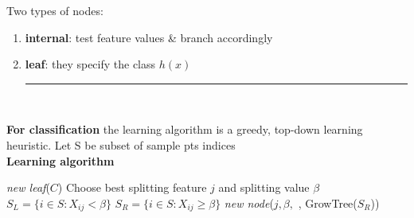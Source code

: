\documentclass[10pt,landscape]{article}
\newcommand{\ruler}{\\\noindent\rule{\linewidth}{0.25pt}\\}
\begin{document}
\begin{multicols*}{3}
    Two types of nodes:
    \begin{enumerate}
        \item \textbf{internal}: test feature values \& branch accordingly
        \item \textbf{leaf}: they specify the class \( h(x) \)
              \ruler%
    \end{enumerate}
    \textbf{For classification} the learning algorithm is a greedy, top-down learning heuristic. Let S be subset of sample pts indices\\
    \textbf{Learning algorithm}\\

    \begin{algorithmic}
        \State \Return \textit{new leaf}($C$)
        \Else
        \State Choose best splitting feature $j$ and splitting value $\beta$
        \State $S_L = \{ i \in S: X_{ij} < \beta \}$
        \State $S_R = \{ i \in S: X_{ij} \ge \beta \}$
        \State \Return \textit{new node}($j, \beta,$ , GrowTree($S_R$))
        \EndIf
        \EndFunction
    \end{algorithmic}
\end{multicols*}
\end{document}
